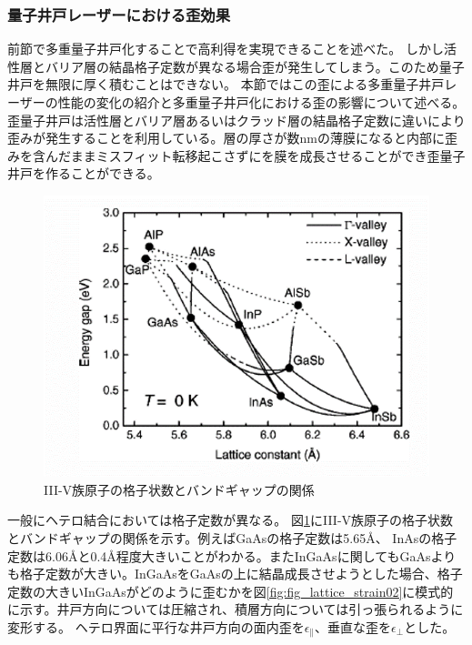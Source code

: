 \subsubsection{量子井戸レーザーにおける歪効果}
前節で多重量子井戸化することで高利得を実現できることを述べた。
しかし活性層とバリア層の結晶格子定数が異なる場合歪が発生してしまう。このため量子井戸を無限に厚く積むことはできない。
本節ではこの歪による多重量子井戸レーザーの性能の変化の紹介と多重量子井戸化における歪の影響について述べる。
歪量子井戸は活性層とバリア層あるいはクラッド層の結晶格子定数に違いにより歪みが発生することを利用している。層の厚さが数nmの薄膜になると内部に歪みを含んだままミスフィット転移起こさずにを膜を成長させることができ歪量子井戸を作ることができる。
\begin{figure}[h]
	\centering
	\includegraphics[width=14cm]{figure/fig_1_1_lattice_constance.png}
	\caption{III-V族原子の格子状数とバンドギャップの関係\cite{ref_band_para}}
	\label{fig:fig_1_1_lattice_constance}
\end{figure}

一般にヘテロ結合においては格子定数が異なる。
図\ref{fig:fig_1_1_lattice_constance}にIII-V族原子の格子状数とバンドギャップの関係を示す\cite{ref_band_para}。例えばGaAsの格子定数は5.65\AA 、 InAsの格子定数は6.06\AA と0.4\AA 程度大きいことがわかる。またInGaAsに関してもGaAsよりも格子定数が大きい。InGaAsをGaAsの上に結晶成長させようとした場合、格子定数の大きいInGaAsがどのように歪むかを図\ref{fig:fig_lattice_strain02}に模式的に示す。井戸方向については圧縮され、積層方向については引っ張られるように変形する。
ヘテロ界面に平行な井戸方向の面内歪を$\epsilon_{\|}$、垂直な歪を$\epsilon_{\bot}$とした。

